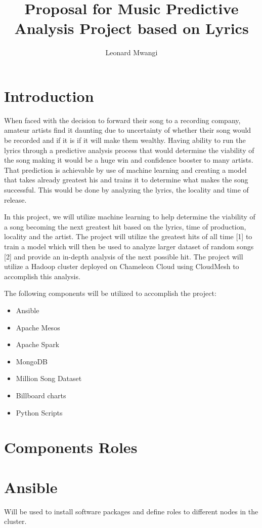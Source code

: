 \documentclass[9pt,twocolumn,twoside]{../../styles/osajnl}
\title{Proposal for Music Predictive Analysis Project based on Lyrics}
\author[1,*]{Leonard Mwangi}
\affil[1]{School of Informatics and Computing, Bloomington, IN 47408, U.S.A.}
\affil[*]{Corresponding authors: lmwangi@iu.com}
\begin{document}
\maketitle

\section{Introduction}
When faced with the decision to forward their song to a recording
company, amateur artists find it daunting due to uncertainty of
whether their song would be recorded and if it is if it will make them
wealthy.  Having ability to run the lyrics through a predictive
analysis process that would determine the viability of the song making
it would be a huge win and confidence booster to many artists. That
prediction is achievable by use of machine learning and creating a
model that takes already greatest his and trains it to determine what
makes the song successful. This would be done by analyzing the lyrics,
the locality and time of release.

In this project, we will utilize machine learning to help determine
the viability of a song becoming the next greatest hit based on the
lyrics, time of production, locality and the artist. The project will
utilize the greatest hits of all time [1] to train a model which will
then be used to analyze larger dataset of random songs [2] and provide
an in-depth analysis of the next possible hit. The project will
utilize a Hadoop cluster deployed on Chameleon Cloud using CloudMesh
to accomplish this analysis.

The following components will be utilized to accomplish the project:
\begin{itemize}
\item Ansible
\item Apache Mesos
\item Apache Spark
\item MongoDB
\item Million Song Dataset
\item Billboard charts
\item Python Scripts
\end{itemize}

\section{Components Roles}

\section*{Ansible}
Will be used to install software packages and define roles to
different nodes in the cluster.
\end{document}
